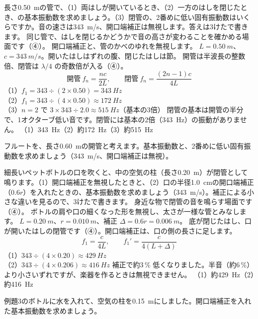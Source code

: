 \label{ph:波-6:ex2}
\begin{phreidai}[開管と閉管の音の高さ]
長さ\qty{0.50}{m}の管で、（1）両はしが開いているとき、（2）一方のはしを閉じたとき、の基本振動数を求めましょう。（3）閉管の、2番めに低い固有振動数はいくらですか。音の速さは\qty{343}{m/s}、開口端補正は無視します。答えは3けたで書きます。
\phbamen
同じ管で、はしを閉じるかどうかで音の高さが変わることを確かめる場面です（④）。
\phmushi
開口端補正と、管のかべのゆれを無視します。
\phzu
$L=\qty{0.50}{m}$、$c=\qty{343}{m/s}$。開いたはしはずれの腹、閉じたはしは節。
\phriyu
開管は半波長の整数倍、閉管は $\lambda/4$ の奇数倍が入る（④）。
\phtateru
\[\text{開管}\ f_n=\frac{nc}{2L},\qquad\text{閉管}\ f_n=\frac{(2n-1)c}{4L}\]
\phtoku
（1）$f_1=343\div(2\times0.50)=\qty{343}{Hz}$\\
（2）$f_1=343\div(4\times0.50)\approx\qty{172}{Hz}$\\
（3）$n=2$ で $3\times343\div2.0\approx\qty{515}{Hz}$（基本の3倍）
\phtashikame
閉管の基本は開管の半分で、1オクターブ低い音です。閉管には基本の2倍（\qty{343}{Hz}）の振動がありません。
\kotae （1）\qty{343}{Hz}（2）約\qty{172}{Hz}（3）約\qty{515}{Hz}
\end{phreidai}
\begin{jibun}
フルートを、長さ\qty{0.60}{m}の開管と考えます。基本振動数と、2番めに低い固有振動数を求めましょう（\qty{343}{m/s}、開口端補正は無視）。
\end{jibun}

\label{ph:波-6:ex3}
\begin{phreidai}[ペットボトルの笛]
細長いペットボトルの口を吹くと、中の空気の柱（長さ\qty{0.20}{m}）が閉管として鳴ります。（1）開口端補正を無視したときと、（2）口の半径\qty{1.0}{cm}の開口端補正（$0.6r$）を入れたときの、基本振動数を求めましょう（\qty{343}{m/s}）。補正による小さな違いを見るので、3けたで書きます。
\phbamen
身近な物で閉管の音を鳴らす場面です（④）。
\phmushi
ボトルの肩や口の細くなった形を無視し、太さが一様な管とみなします。
\phzu
$L=\qty{0.20}{m}$、$r=\qty{0.010}{m}$、補正 $\Delta=0.6r=\qty{0.006}{m}$。
\phriyu
底が閉じたはし、口が開いたはしの閉管です（④）。開口端補正は、口の側の長さに足します。
\phtateru
\[f_1=\frac{c}{4L},\qquad f_1'=\frac{c}{4(L+\Delta)}\]
\phtoku
（1）$343\div(4\times0.20)\approx\qty{429}{Hz}$\\
（2）$343\div(4\times0.206)\approx\qty{416}{Hz}$
\phtashikame
補正で約3\,\% 低くなりました。半音（約6\,\%）より小さいずれですが、楽器を作るときは無視できません。
\kotae （1）約\qty{429}{Hz}（2）約\qty{416}{Hz}
\end{phreidai}
\begin{jibun}
例題3のボトルに水を入れて、空気の柱を\qty{0.15}{m}にしました。開口端補正を入れた基本振動数を求めましょう。
\end{jibun}

